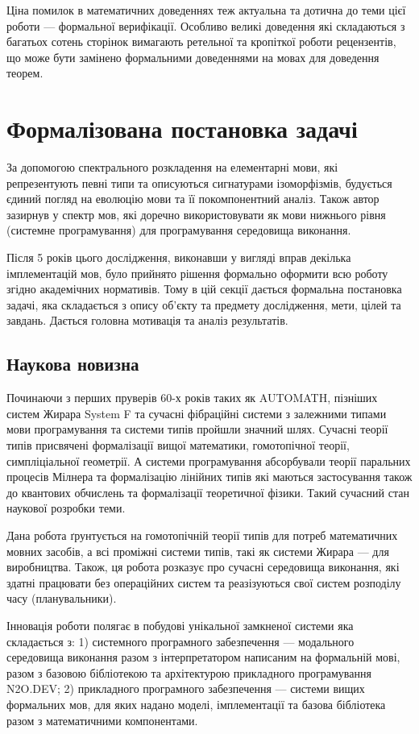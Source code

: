 Ціна помилок в математичних доведеннях теж актуальна та дотична до теми цієї роботи ---
формальної верифікації. Особливо великі доведення які складаються з багатьох сотень
 сторінок вимагають ретельної та кропіткої роботи рецензентів, що може бути замінено
формальними доведеннями на мовах для доведення теорем.

\section{Формалізована постановка задачі}
За допомогою спектрального розкладення на елементарні мови, які репрезентують
певні типи та описуються сигнатурами ізоморфізмів, будується єдиний погляд на
еволюцію мови та її покомпонентний аналіз. Також автор зазирнув у спектр мов,
які доречно використовувати як мови нижнього рівня (системне програмування)
для програмування середовища виконання.

Після 5 років цього дослідження, виконавши у вигляді вправ декілька імплементацій мов,
було прийнято рішення формально оформити всю роботу згідно академічних нормативів.
Тому в цій секції дається формальна постановка задачі, яка складається з опису
об'єкту та предмету дослідження, мети, цілей та завдань.
Дається головна мотивація та аналіз результатів.

\subsection{Наукова новизна}
Починаючи з перших пруверів 60-х років таких як AUTOMATH, пізніших систем Жирара
System F та сучасні фібраційні системи з залежними типами мови програмування та
системи типів пройшли значний шлях. Сучасні теорії типів присвячені формалізації
вищої математики, гомотопічної теорії, симпліціальної геометрії. А системи
програмування абсорбували теорії паральних процесів Мілнера та формалізацію
лінійних типів які маються застосування також до квантових обчислень та формалізації
теоретичної фізики. Такий сучасний стан наукової розробки теми.

Дана робота ґрунтується на гомотопічній теорії типів для потреб математичних
мовних засобів, а всі проміжні системи типів, такі як системи Жирара --- для
виробництва. Також, ця робота розказує про сучасні середовища виконання, які
здатні працювати без операційних систем та реазізуються свої систем розподілу
часу (планувальники).

Інновація роботи полягає в побудові унікальної замкненої системи яка
складається з:
1) системного програмного забезпечення --- модального середовища
виконання разом з інтерпретатором написаним на формальній мові, разом з
базовою бібліотекою та архітектурою прикладного програмування N2O.DEV;
2) прикладного програмного забезпечення --- системи вищих формальних мов,
для яких надано моделі, імплементації та базова бібліотека разом з математичними
компонентами.

